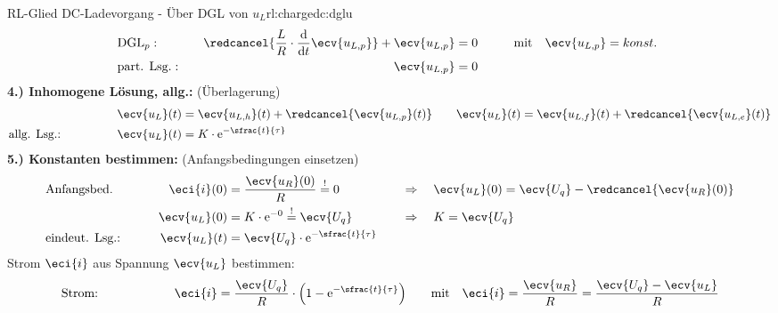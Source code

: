 {\begin{bsp}{RL-Glied DC-Ladevorgang - Über DGL von $u_L$}{rl:chargedc:dglu}
    \begin{align*}%
        &\text{DGL}_{p}:&&&
            \redcancel{\frac{L}{R} \cdot \frac{\mathrm{d}}{\mathrm{d}t} \ecv{u_{L,p}}} + \ecv{u_{L,p}} &= 0 &&&
                &\text{mit}\quad \ecv{u_{L,p}} = konst.  \\
        &\text{part. Lsg.}:&&&
            \ecv{u_{L,p}} &= 0
            \\[-15pt]&\hphantom{R1ooooooo}&&&\hphantom{L3oooooooooooooooooooo}&\hphantom{R3ooo}&&&&\hphantom{R5oooooooooooooooooooooo}\nonumber%
        \end{align*}%
    \textbf{4.) Inhomogene Lösung, allg.:} (Überlagerung)%
    \begin{align*}%
        &&&&
            \ecv{u_L}(t) &= \ecv{u_{L,h}}(t) + \redcancel{\ecv{u_{L,p}}(t)} &&&
            &\ecv{u_L}(t)= \ecv{u_{L,f}}(t) + \redcancel{\ecv{u_{L,e}}(t)}  \\
        &\text{allg. Lsg.:}&&&
            \ecv{u_L}(t) &= K \cdot \mathrm{e}^{-\sfrac{t}{\tau}}
        \\[-15pt]&\hphantom{R1oooooooooooo}&&&\hphantom{L3ooo}&\hphantom{R3oooooooooooooooo}&&&&\hphantom{R5oooooooooooooooooooooo}\nonumber%
    \end{align*}%
    \textbf{5.) Konstanten bestimmen:} (Anfangsbedingungen einsetzen)%
    \begin{align*}%
        &\text{Anfangsbed.}&&&
            \eci{i}(0) &= \frac{\ecv{u_R}(0)}{R} \overset{!}{=} 0 &&&
            &\Rightarrow\quad \ecv{u_L}(0) = \ecv{U_q} - \redcancel{\ecv{u_R}(0)}\\
        &&&&
            \ecv{u_L}(0) &= K \cdot \mathrm{e}^{-0} \overset{!}{=} \ecv{U_q} &&&
            &\Rightarrow\quad K = \ecv{U_q}\\
        &\text{eindeut. Lsg.:}&&&
            \ecv{u_L}(t) &= \ecv{U_q} \cdot \mathrm{e}^{-\sfrac{t}{\tau}}
        \\[-15pt]&\hphantom{R1oooooooooooo}&&&\hphantom{L3ooo}&\hphantom{R3oooooooooooooooo}&&&&\hphantom{R5oooooooooooooooooooooo}\nonumber%
        \end{align*}%
    Strom $\eci{i}$ aus Spannung $\ecv{u_L}$ bestimmen:%
    \begin{align*}%
        &\text{Strom:}&&&
            \eci{i} &= \frac{\ecv{U_q}}{R} \cdot \left( 1 - \mathrm{e}^{-\sfrac{t}{\tau}} \right) &&&
            &\text{mit}\quad \eci{i} = \frac{\ecv{u_R}}{R} = \frac{\ecv{U_q} - \ecv{u_L}}{R}
        \\[-15pt]&\hphantom{R1oooooooooooo}&&&\hphantom{L3ooo}&\hphantom{R3oooooooooooooooo}&&&&\hphantom{R5oooooooooooooooooooooo}\nonumber%
    \end{align*}
    \endgroup
\end{bsp}
}%

